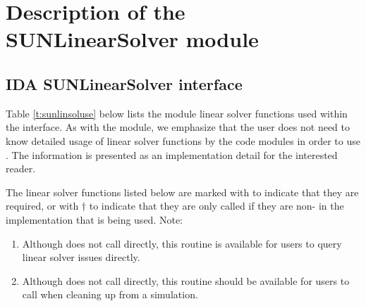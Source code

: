 \chapter{Description of the SUNLinearSolver module}\label{s:sunlinsol}



\section{IDA SUNLinearSolver interface}
\label{s:sunlinsol_interface}

Table \ref{t:sunlinsoluse} below lists the {\sunlinsol} module linear solver
functions used within the {\idals} interface. As with the {\sunmatrix} module, we
emphasize that the {\ida} user does not need to know detailed usage of linear
solver functions by the {\ida} code modules in order to use {\ida}. The
information is presented as an implementation detail for the interested reader.

The linear solver functions listed below are marked with \cm to
indicate that they are required, or with $\dagger$ to indicate that
they are only called if they are non- in the {\sunlinsol}
implementation that is being used. Note:
\begin{enumerate}
\item Although {\idals} does not call 
  directly, this routine is available for users to query linear solver
  issues directly.
\item Although {\idals} does not call 
  directly, this routine should be available for users to call when
  cleaning up from a simulation.
\end{enumerate}

